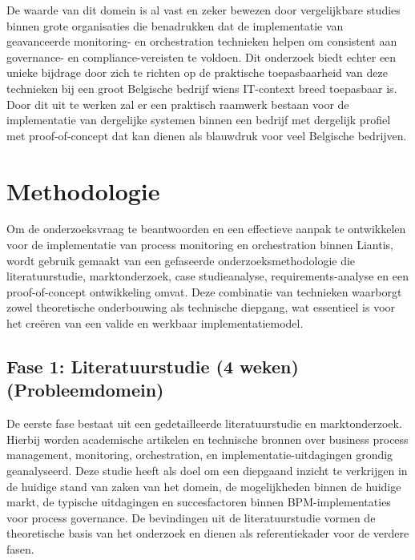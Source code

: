 De waarde van dit domein is al vast en zeker bewezen door vergelijkbare studies binnen grote organisaties \autocite{Harmon2014} die benadrukken dat de implementatie van geavanceerde monitoring- en orchestration technieken helpen om consistent aan governance- en compliance-vereisten te voldoen. Dit onderzoek biedt echter een unieke bijdrage door zich te richten op de praktische toepasbaarheid van deze technieken bij een groot Belgische bedrijf wiens IT-context breed toepasbaar is. Door dit uit te werken zal er een praktisch raamwerk bestaan voor de implementatie van dergelijke systemen binnen een bedrijf met dergelijk profiel met proof-of-concept dat kan dienen als blauwdruk voor veel Belgische bedrijven. 

\section{Methodologie}%
\label{sec:methodologie}

Om de onderzoeksvraag te beantwoorden en een effectieve aanpak te ontwikkelen voor de implementatie van process monitoring en orchestration binnen Liantis, wordt gebruik gemaakt van een gefaseerde onderzoeksmethodologie die literatuurstudie, marktonderzoek, case studieanalyse, requirements-analyse en een proof-of-concept ontwikkeling omvat. Deze combinatie van technieken waarborgt zowel theoretische onderbouwing als technische diepgang, wat essentieel is voor het creëren van een valide en werkbaar implementatiemodel.

\subsection{Fase 1: Literatuurstudie (4 weken) (Probleemdomein)}

De eerste fase bestaat uit een gedetailleerde literatuurstudie en marktonderzoek. Hierbij worden academische artikelen en technische bronnen over business process management, monitoring, orchestration, en implementatie-uitdagingen grondig geanalyseerd. Deze studie heeft als doel om een diepgaand inzicht te verkrijgen in de huidige stand van zaken van het domein, de mogelijkheden binnen de huidige markt, de typische uitdagingen en succesfactoren binnen BPM-implementaties voor process governance. De bevindingen uit de literatuurstudie vormen de theoretische basis van het onderzoek en dienen als referentiekader voor de verdere fasen. \\


